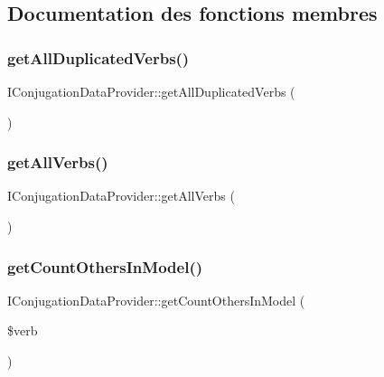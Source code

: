 \subsection{Documentation des fonctions membres}
\hypertarget{interface_i_conjugation_data_provider_a4526378019b6276cb91e64bddd3b1d77}{}\label{interface_i_conjugation_data_provider_a4526378019b6276cb91e64bddd3b1d77} 
\subsubsection{\texorpdfstring{get\+All\+Duplicated\+Verbs()}{getAllDuplicatedVerbs()}}
{\footnotesize\ttfamily I\+Conjugation\+Data\+Provider\+::get\+All\+Duplicated\+Verbs (\begin{DoxyParamCaption}{ }\end{DoxyParamCaption})}

\hypertarget{interface_i_conjugation_data_provider_acd3b7b4f960ad952b0c4e929d02c8923}{}\label{interface_i_conjugation_data_provider_acd3b7b4f960ad952b0c4e929d02c8923} 
\subsubsection{\texorpdfstring{get\+All\+Verbs()}{getAllVerbs()}}
{\footnotesize\ttfamily I\+Conjugation\+Data\+Provider\+::get\+All\+Verbs (\begin{DoxyParamCaption}{ }\end{DoxyParamCaption})}

\hypertarget{interface_i_conjugation_data_provider_a62018b8fae6510989ebcb9c974958586}{}\label{interface_i_conjugation_data_provider_a62018b8fae6510989ebcb9c974958586} 
\subsubsection{\texorpdfstring{get\+Count\+Others\+In\+Model()}{getCountOthersInModel()}}
{\footnotesize\ttfamily I\+Conjugation\+Data\+Provider\+::get\+Count\+Others\+In\+Model (\begin{DoxyParamCaption}\item[{}]{\$verb }\end{DoxyParamCaption})}

